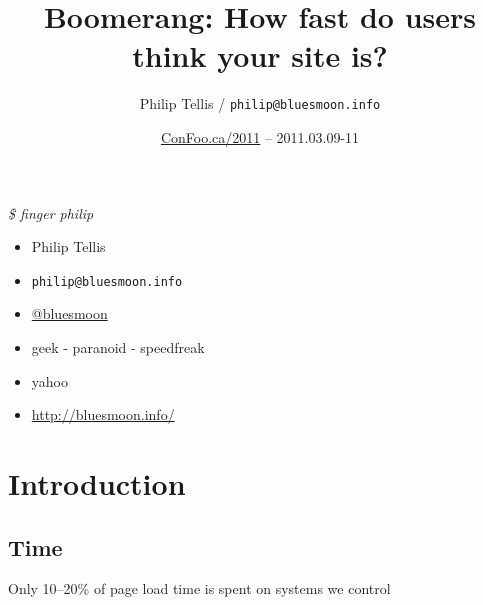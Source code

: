 \documentclass{beamer}
\author{Philip Tellis / \texttt{philip@bluesmoon.info}}
\title{Boomerang: How fast do users think your site is?}
\date{\href{http://confoo.ca/}{ConFoo.ca/2011} -- 2011.03.09-11}
\begin{document}
\begin{frame}
  \titlepage
\end{frame}


\begin{frame}{\textit{\$ finger philip}}
  \begin{itemize}
  \item Philip Tellis
  \item \small{\texttt{philip@bluesmoon.info}}
  \item \href{http://twitter.com/bluesmoon}{@bluesmoon}
  \item geek - paranoid - speedfreak
  \item yahoo
  \item \href{http://bluesmoon.info/}{http://bluesmoon.info/}
  \end{itemize}
\end{frame}


\section{Introduction}

\subsection{Time}

\begin{frame}{}
\end{frame}

\begin{frame}{}
\end{frame}

\begin{frame}{}
\end{frame}

\begin{frame}{}
  \begin{center}
  Only 10--20\% of page load time is spent on systems we control
  \end{center}
\end{frame}
\end{document}
